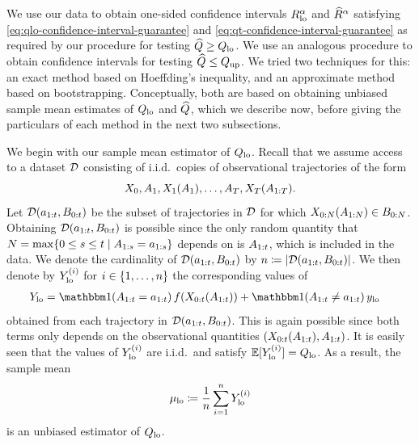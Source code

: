 We use our data to obtain one-sided confidence intervals $R_{\mathrm{lo}}^{\alpha}$ and $\widehat{R}^{\alpha}$ satisfying \eqref{eq:qlo-confidence-interval-guarantee} and \eqref{eq:qt-confidence-interval-guarantee} as required by our procedure for testing $\widehat{Q} \geq Q_{\mathrm{lo}}$.
We use an analogous procedure to obtain confidence intervals for testing $\widehat{Q} \leq Q_{\mathrm{up}}$.
We tried two techniques for this: an exact method based on Hoeffding's inequality, and an approximate method based on bootstrapping.
Conceptually, both are based on obtaining unbiased sample mean estimates of $Q_{\mathrm{lo}}$ and $\widehat{Q}$, which we describe now, before giving the particulars of each method in the next two subsections.



We begin with our sample mean estimator of $Q_{\mathrm{lo}}$.
Recall that we assume access to a dataset $\mathcal{D}$ consisting of i.i.d.\ copies of observational trajectories of the form
\[
    X_0, A_1, X_1(A_1), \ldots, A_T, X_T(A_{1:T}).
\]
Let $\mathcal{D}(a_{1:t}, B_{0:t})$ be the subset of trajectories in $\mathcal{D}$ for which $X_{0:N}(A_{1:N})\in B_{0:N}$.
Obtaining $\mathcal{D}(a_{1:t}, B_{0:t})$ is possible since the only random quantity that $N = \max\{0 \leq s \leq t \mid A_{1:s} = a_{1:s}\}$ depends on is $A_{1:t}$, which is included in the data.
We denote the cardinality of $\mathcal{D}(a_{1:t}, B_{0:t})$ by $n \coloneqq |\mathcal{D}(a_{1:t}, B_{0:t})|$.
We then denote by $Y_{\mathrm{lo}}^{(i)}$ for $i \in \{1, \ldots, n\}$ the corresponding values of
\begin{align*}
    \Ylo &= \ind(\A_{1:\tx} = \ax_{1:\tx}) \, \fx(\X_{0:\tx}(\A_{1:\tx})) + \ind(\A_{1:\tx} \neq \ax_{1:\tx}) \, \ylo
\end{align*}
obtained from each trajectory in $\mathcal{D}(a_{1:t}, B_{0:t})$.
This is again possible since both terms only depends on the observational quantities $(X_{0:t}(A_{1:t}), A_{1:t})$.
It is easily seen that the values of $Y_{\mathrm{lo}}^{(i)}$ are i.i.d.\ and satisfy $\mathbb{E}[Y_{\mathrm{lo}}^{(i)}] = Q_{\mathrm{lo}}$.
As a result, the sample mean
\begin{equation} \label{eq:YClmean-definition-supplement}
    {\mu_{\mathrm{lo}}} \coloneqq \frac{1}{n} \sum_{i=1}^{n} Y_{\mathrm{lo}}^{(i)} 
\end{equation}
is an unbiased estimator of $Q_{\mathrm{lo}}$.

